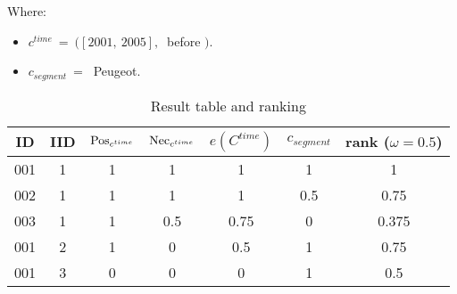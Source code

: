 Where:
\begin{itemize}
\item
$c^{time}\ = \ ( \left[ 2001,\ 2005 \right],\ $  before $)$.
\item
$c_{segment}\ = \ $ Peugeot.
\end{itemize}



\begin{table}[ht]
\caption{Result table and ranking}
\centering
\begin{tabular}{c c c c c c c}
\hline
ID & IID &  $\operatorname{Pos}_{c^{time}}$ &$\operatorname{Nec}_{c^{time}}$ & $e(C^{time})$ & $c_{segment}$ & rank ($\omega=0.5$) \\ [0.5ex]
\hline
001 & 1 & 1 &  1 & 1 & 1 & 1 \\
002 & 1 & 1 & 1 & 1 & 0.5 & 0.75 \\
003 & 1 & 1 & 0.5 & 0.75 &0 & 0.375\\
001 & 2 & 1 & 0 & 0.5 &1 & 0.75 \\
001 & 3 & 0 & 0 & 0 &1 & 0.5\\
\hline
\end{tabular}
\label{tb:results}
\end{table}




